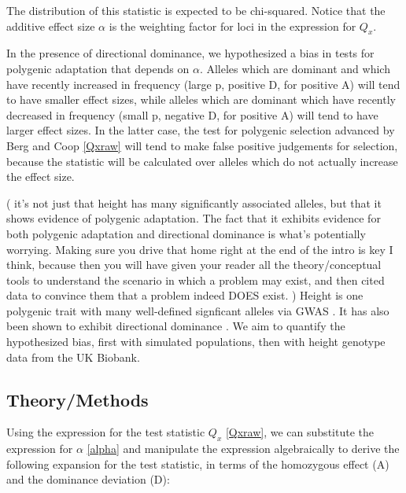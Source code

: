\documentclass[a4paper,12pt]{article}
\newcommand{\jb}[1]{{\color{blue} (#1)} }
\begin{document}
The distribution of this statistic is expected to be chi-squared. Notice that the additive effect size $\alpha$ is the weighting factor for loci in the
expression for $Q_x$. 

In the presence of directional dominance, we hypothesized a bias in
tests for polygenic adaptation that depends on $\alpha$. Alleles which are dominant and which have recently increased in
frequency (large p, positive D, for positive A) will tend to have smaller effect sizes, while
alleles which are dominant which have recently decreased in frequency
(small p, negative D, for positive A) will tend to have larger effect sizes. In the
latter case, the test for polygenic selection advanced by Berg and Coop
\eqref{Qxraw} will tend to make false positive judgements for
selection, because the statistic will be calculated over alleles which
do not actually increase the effect size.


\jb{
  it's not just that height has many significantly associated alleles, but that it
  shows evidence of polygenic adaptation. The fact that it exhibits evidence for both polygenic adaptation
  and directional dominance is what's potentially worrying. Making sure you drive that home right at the end of
  the intro is key I think, because then you will have given your reader all the theory/conceptual tools to
  understand the scenario in which a problem may exist, and then cited data to convince them that a problem indeed DOES exist.
}
Height is one polygenic trait with many well-defined signficant
alleles via GWAS \cite{heightselection}. It has also been shown to exhibit
directional dominance \cite{heightdirectdom}. We aim to quantify the
hypothesized bias, first with simulated populations, then with height genotype data from the UK Biobank.



\subsection*{Theory/Methods}



Using the expression for the test statistic $Q_x$ \eqref{Qxraw}, we
can substitute the expression for $\alpha$ \eqref{alpha} and manipulate
the expression algebraically to derive the following expansion for the
test statistic, in terms of the homozygous effect (A)  and the dominance
deviation (D):
\end{document}
